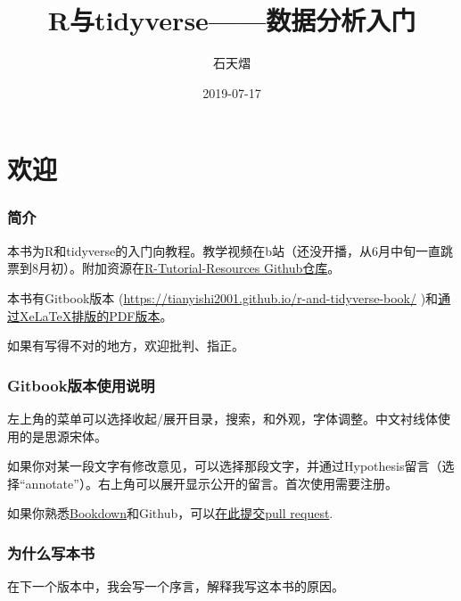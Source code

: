 \documentclass[]{book}
\title{R与tidyverse------数据分析入门}
\author{石天熠}
\date{2019-07-17}
\begin{document}
\maketitle

{
\setcounter{tocdepth}{1}
\tableofcontents
}
\hypertarget{welcome}{%
\chapter*{欢迎}\label{welcome}}

\hypertarget{intro}{%
\subsection*{简介}\label{intro}}

本书为R和tidyverse的入门向教程。教学视频在b站（还没开播，从6月中旬一直跳票到8月初）。附加资源在\href{https://github.com/TianyiShi2001/R-Tutorial-Resorces}{R-Tutorial-Resources Github仓库}。

本书有Gitbook版本 (\url{https://tianyishi2001.github.io/r-and-tidyverse-book/} )和\href{https://tianyishi2001.github.io/r-and-tidyverse-book/R与tidyverse——数据分析入门.pdf}{通过XeLaTeX排版的PDF版本}。

如果有写得不对的地方，欢迎批判、指正。

\hypertarget{man}{%
\subsection*{Gitbook版本使用说明}\label{man}}

左上角的菜单可以选择收起/展开目录，搜索，和外观，字体调整。中文衬线体使用的是思源宋体。

如果你对某一段文字有修改意见，可以选择那段文字，并通过Hypothesis留言（选择``annotate''）。右上角可以展开显示公开的留言。首次使用需要注册。

如果你熟悉\href{https://bookdown.org}{Bookdown}和Github，可以\href{https://github.com/TianyiShi2001/r-and-tidyverse-book}{在此提交pull request}.

\hypertarget{why}{%
\subsection*{为什么写本书}\label{why}}

在下一个版本中，我会写一个序言，解释我写这本书的原因。
\end{document}
